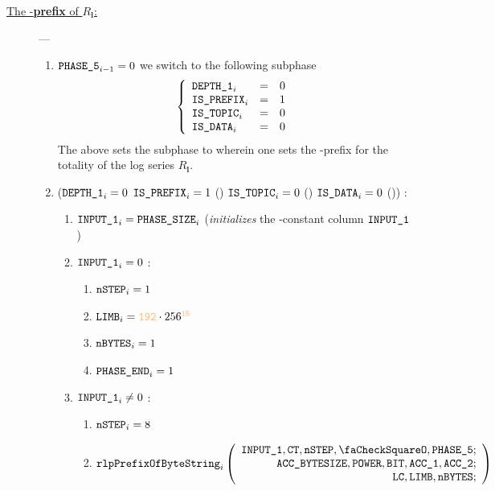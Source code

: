 \begin{description}
	\item[\underline{The \rlp{}-\textbf{prefix} of $R_\mathbf{l}$:}] ---
		\begin{enumerate}[resume]
			\item \If $\texttt{PHASE\_5}_{i-1}=0$ \Then we switch to the following subphase
				\[
					\left\{ \begin{array}{lcl}
						\texttt{DEPTH\_1}_{i}   & = & 0 \\
						\texttt{IS\_PREFIX}_{i}  & = & 1 \\
						\texttt{IS\_TOPIC}_{i}      & = & 0 \\
						\texttt{IS\_DATA}_{i}      & = & 0 \\
					\end{array} \right.
				\]
				\saNote{} The above sets the subphase to wherein one sets the \rlp{}-prefix for the totality of the log series $R_\textbf{l}$. 
			\item \If ($\texttt{DEPTH\_1}_{i}=0$ \et $\texttt{IS\_PREFIX}_{i}=1$ (\trash) \et $\texttt{IS\_TOPIC}_{i}=0$ (\trash) \et $\texttt{IS\_DATA}_{i}=0$ (\trash)) \Then:
				\begin{enumerate}
					\item $\texttt{INPUT\_1}_{i} = \texttt{PHASE\_SIZE}_{i}$ (\emph{initializes} the \ct{}-constant column $\texttt{INPUT\_1}$)
					\item \If $\texttt{INPUT\_1}_{i}=0$ \Then:
						\begin{enumerate}
							\item $\texttt{nSTEP}_{i}=1$
							\item $\limb_{i}=\rlprefixShortList \cdot 256 ^{\llargeMO}$
							\item $\texttt{nBYTES}_{i}=1$
							\item $\texttt{PHASE\_END}_{i}=1$
						\end{enumerate}
					\item \If $\texttt{INPUT\_1}_{i} \neq 0$ \Then:
						\begin{enumerate}
							\item $\texttt{nSTEP}_{i} = 8$
							\item 
								\[
									\rlpPrefixByteString_{i}
									\left( \begin{array}{r}
										\Input1,
										\ct,
										\nbstep,
										\done,
										\phase{5}; \\
										\accsize,
										\col{POWER},
										\col{BIT},
										\acc1,
										\acc2; \\
										\lc,
										\limb,
										\limbsize; \\
									\end{array} \right)
\]
\end{enumerate}
\end{enumerate}
\end{enumerate}
\end{description}
